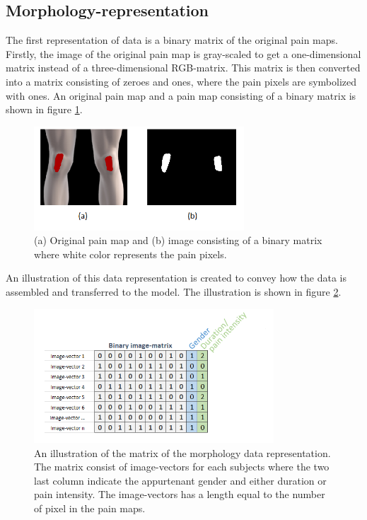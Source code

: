 \subsection{Morphology-representation} \label{sec:Morph}
The first representation of data is a binary matrix of the original pain maps.
Firstly, the image of the original pain map is gray-scaled to get a one-dimensional matrix instead of a three-dimensional RGB-matrix. This matrix is then converted into a matrix consisting of zeroes and ones, where the pain pixels are symbolized with ones. An original pain map and a pain map consisting of a binary matrix is shown in figure \ref{fig:cropbin7}.

\begin{figure} [H]
\centering
\includegraphics[width=0.7\textwidth]{figures/cropbin7}
\caption{(a) Original pain map and (b) image consisting of a binary matrix where white color represents the pain pixels.}
\label{fig:cropbin7}
\end{figure}

\noindent
An illustration of this data representation is created to convey how the data is assembled and transferred to the model. The illustration is shown in figure \ref{fig:binmatrix}.

\begin{figure} [H]
\centering
\includegraphics[width=0.8\textwidth]{figures/binaryimagematrix}
\caption{An illustration of the matrix of the morphology data representation. The matrix consist of image-vectors for each subjects where the two last column indicate the appurtenant gender and either duration or pain intensity. The image-vectors has a length equal to the number of pixel in the pain maps.}
\label{fig:binmatrix}
\end{figure}



